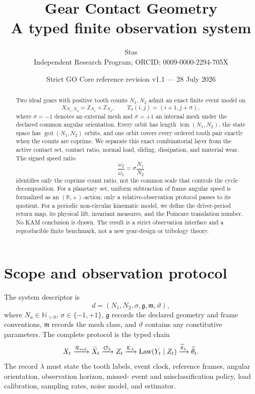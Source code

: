 \documentclass[11pt,a4paper]{article}
\title{\bfseries Gear Contact Geometry\\
\large A typed finite observation system}
\author{Stas\\
\small Independent Research Program; ORCID: 0009-0000-2294-705X}
\date{Strict GO Core reference revision v1.1 --- 28 July 2026}
\theoremstyle{definition}
\theoremstyle{plain}
\theoremstyle{remark}
\newcommand{\R}{\mathbb{R}}
\newcommand{\Z}{\mathbb{Z}}
\newcommand{\Ocal}{\mathcal O}
\newcommand{\Kcal}{\mathcal K}
\newcommand{\Rcal}{\mathcal R}
\begin{document}
\maketitle

\begin{center}
\end{center}

\begin{abstract}
Two ideal gears with positive tooth counts \(N_1,N_2\) admit an exact
finite event model on
\[
X_{N_1,N_2}=\Z_{N_1}\times\Z_{N_2},\qquad
T_\sigma(i,j)=(i+1,j+\sigma),
\]
where \(\sigma=-1\) denotes an external mesh and \(\sigma=+1\) an
internal mesh under the declared common angular orientation. Every
orbit has length \(\operatorname{lcm}(N_1,N_2)\), the state space has
\(\gcd(N_1,N_2)\) orbits, and one orbit covers every ordered tooth
pair exactly when the counts are coprime. We separate this exact
combinatorial layer from the active contact set, contact ratio,
normal load, sliding, dissipation, and material wear. The signed speed
ratio
\[
\frac{\omega_2}{\omega_1}
=\sigma\frac{N_1}{N_2}
\]
identifies only the coprime count ratio, not the common scale that
controls the cycle decomposition. For a planetary set, uniform
subtraction of frame angular speed is formalized as an
\((\R,+)\)-action; only a relative-observation protocol passes to its
quotient. For a periodic non-circular kinematic model, we define the
driver-period return map, its physical lift, invariant measures, and
the Poincare translation number. No KAM conclusion is drawn. The
result is a strict observation interface and a reproducible finite
benchmark, not a new gear-design or tribology theory.
\end{abstract}

\tableofcontents

\section{Scope and observation protocol}

The system descriptor is
\[
d=(N_1,N_2,\sigma,\mathfrak g,\mathfrak m,\vartheta),
\]
where \(N_a\in\mathbb N_{>0}\), \(\sigma\in\{-1,+1\}\),
\(\mathfrak g\) records the declared geometry and frame conventions,
\(\mathfrak m\) records the mesh class, and \(\vartheta\) contains any
constitutive parameters. The complete protocol is the typed chain
\[
X_t\xrightarrow{\Rcal_{\rm red}}\widetilde X_t
\xrightarrow{\Ocal_\lambda}Z_t
\xrightarrow{\Kcal_\lambda}\operatorname{Law}(Y_t\mid Z_t)
\xrightarrow{\widehat\theta_\lambda}\widehat\theta_t.
\]
The record \(\lambda\) must state the tooth labels, event clock,
reference frames, angular orientation, observation horizon, missed-
event and misclassification policy, load calibration, sampling rates,
noise model, and estimator.
\end{document}
